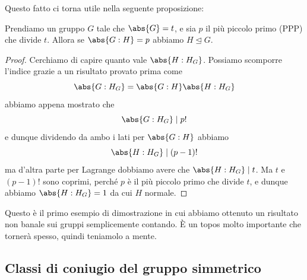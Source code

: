\documentclass[11pt]{scrartcl}
\newcommand{\normal}{\mathrel{\unlhd}}
\begin{document}
	Questo fatto ci torna utile nella seguente proposizione:
	\begin{proposition}
		Prendiamo un gruppo $G$ tale che $\abs{G}=t$, e sia $p$ il più piccolo primo (PPP) che divide $t$. Allora se $\abs{G:H}=p$ abbiamo $H\normal G$.
	\end{proposition}
	\begin{proof}
		Cerchiamo di capire quanto vale $\abs{H:H_G}$. Possiamo scomporre l'indice grazie a un risultato provato prima come
		$$\abs{G:H_G}=\abs{G:H}\abs{H:H_G}$$
		abbiamo appena mostrato che
		$$\abs{G:H_G}\mid p!$$
		e dunque dividendo da ambo i lati per $\abs{G:H}$ abbiamo
		$$\abs{H:H_G}\mid \left(p-1\right)!$$
		ma d'altra parte per Lagrange dobbiamo avere che $\abs{H:H_G}\mid t$. Ma $t$ e $(p-1)!$ sono coprimi, perché $p$ è il più piccolo primo che divide $t$, e dunque abbiamo $\abs{H:H_G}=1$ da cui $H$ normale.
	\end{proof}
	Questo è il primo esempio di dimostrazione in cui abbiamo ottenuto un risultato non banale sui gruppi semplicemente contando. \`E un topos molto importante che tornerà spesso, quindi teniamolo a mente.
	
	\subsection{Classi di coniugio del gruppo simmetrico}
	
\end{document}
